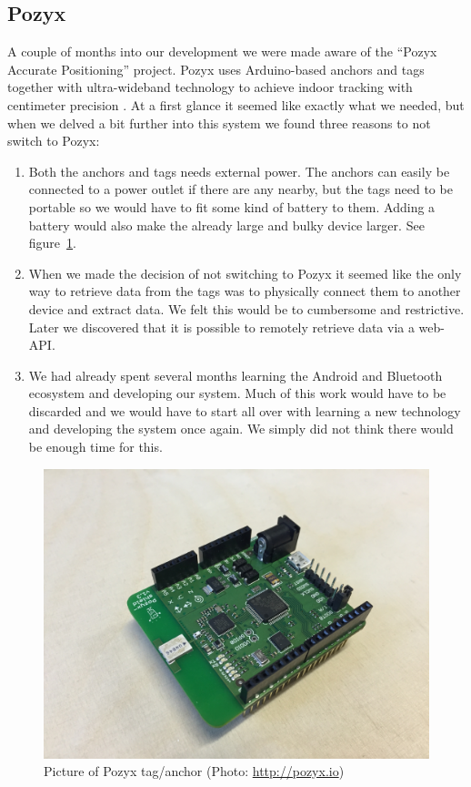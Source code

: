 \documentclass[../Main/thesis.tex]{subfiles}
\begin{document}
\subsection{Pozyx}
A couple of months into our development we were made aware of the ``Pozyx Accurate Positioning'' project.
Pozyx uses Arduino-based anchors and tags together with ultra-wideband technology to achieve indoor tracking with centimeter precision \citep{Pozyx2017}.
At a first glance it seemed like exactly what we needed, but when we delved a bit further into this system we found three reasons to not switch to Pozyx:
\begin{enumerate}
	\item{Both the anchors and tags needs external power. 
		The anchors can easily be connected to a power outlet if there are any nearby, but the tags need to be portable so we would have to fit some kind of battery to them.
		Adding a battery would also make the already large and bulky device larger.
		See figure~\ref{fig:pozyx_tag}}.
	\item{When we made the decision of not switching to Pozyx it seemed like the only way to retrieve data from the tags was to physically connect them to another device and extract data.
		We felt this would be to cumbersome and restrictive.
		Later we discovered that it is possible to remotely retrieve data via a web-API.}
	\item{We had already spent several months learning the Android and Bluetooth ecosystem and developing our system.
		Much of this work would have to be discarded and we would have to start all over with learning a new technology and developing the system once again.
		We simply did not think there would be enough time for this.}
\end{enumerate}

\begin{figure}
	\centering
	\includegraphics[width=0.5\linewidth]{../fig/pozyx_tag}
	\caption{Picture of Pozyx tag/anchor (Photo: \url{http://pozyx.io})}
	\label{fig:pozyx_tag}
\end{figure}
\end{document}
